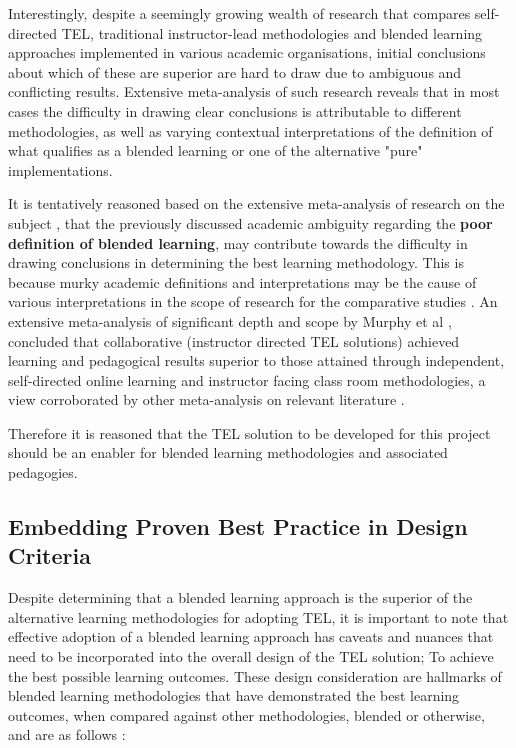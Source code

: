 Interestingly, despite a seemingly growing wealth of research that compares self-directed TEL, traditional instructor-lead methodologies and blended learning approaches implemented in various academic organisations, initial conclusions about which of these are superior are hard to draw due to ambiguous and conflicting results. Extensive meta-analysis of such research \cite{RickReis,Means2009,Team2008} reveals that in most cases the  difficulty in drawing clear conclusions is attributable to different methodologies, as well as varying contextual interpretations of the definition of what qualifies as a blended learning or one of the alternative "pure" implementations.
\newpage

It is tentatively reasoned based on the extensive meta-analysis of research on the subject \cite{Means2009,Team2008,RickReis}, that the previously discussed academic ambiguity regarding the \textbf{poor definition of blended learning}, may contribute towards the difficulty in drawing conclusions in determining the best learning methodology. This is because murky academic definitions and interpretations may be the cause of various interpretations in the scope of research for the comparative studies \cite{Means2009,RickReis,Team2008}. An extensive meta-analysis of significant depth and scope by Murphy et al \cite{Means2009},   concluded that collaborative (instructor directed TEL solutions)  achieved learning and pedagogical results superior to those attained through independent, self-directed online learning \cite{RickReis} and instructor facing class room methodologies, a view corroborated by other  meta-analysis on relevant literature  \cite{Means2009,Team2008,RickReis}.

Therefore it is reasoned that the TEL solution to be developed for this project should be an enabler for blended learning methodologies and associated pedagogies.

\label{sec:sec01}
\subsection{Embedding Proven Best Practice in Design Criteria}
\label{subsec:subsec01}

Despite determining that a blended learning approach is the superior of the alternative learning methodologies for adopting TEL, it is important to note that effective adoption of a blended learning approach has caveats and nuances that need to be incorporated into the overall design of the TEL solution; To achieve the best possible learning outcomes. These design consideration are hallmarks of blended learning methodologies that have demonstrated the best learning outcomes, when compared against other methodologies, blended or otherwise, and are as follows \cite{Means2009,Team2008,RickReis}:


